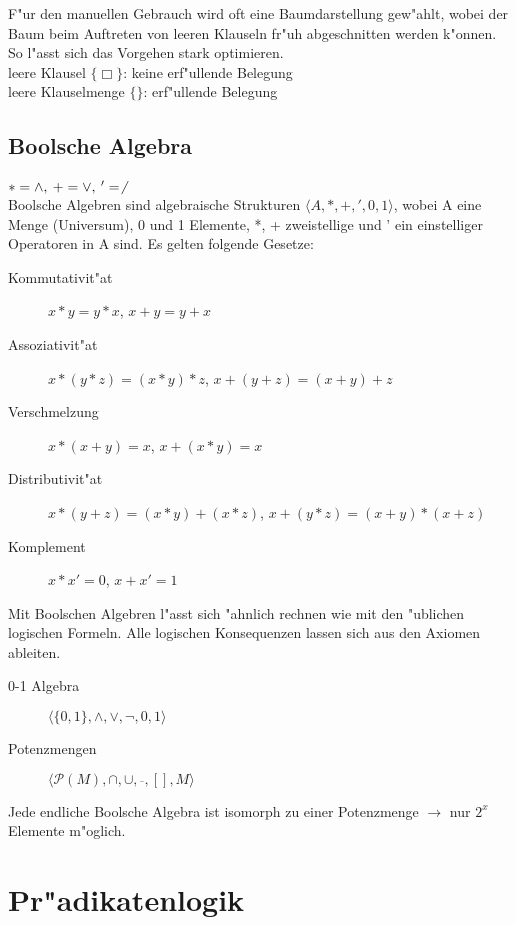 \documentclass[11pt, a4paper,twocolumn]{scrartcl}
\begin{document}
F"ur den manuellen Gebrauch wird oft eine Baumdarstellung gew"ahlt, wobei der Baum beim Auftreten von leeren Klauseln fr"uh abgeschnitten werden k"onnen. So l"asst sich das Vorgehen stark optimieren.\\
leere Klausel $\{\Box\}$: keine erf"ullende Belegung\\
leere Klauselmenge $\{\}$: erf"ullende Belegung

\subsection{Boolsche Algebra}
\paragraph{}
$*=\land,\:+=\lor, \:'=\not$\\
Boolsche Algebren sind algebraische Strukturen $\langle A,*,+,',0,1\rangle$, wobei A eine Menge (Universum), 0 und 1 Elemente, *, + zweistellige und ' ein einstelliger Operatoren in A sind. Es gelten folgende Gesetze:
\begin{description}
 \item[Kommutativit"at] $x*y=y*x$, $x+y=y+x$
 \item[Assoziativit"at] $x*(y*z)=(x*y)*z$, $x+(y+z)=(x+y)+z$
 \item[Verschmelzung] $x*(x+y)=x$, $x+(x*y)=x$
 \item[Distributivit"at] $x*(y+z)=(x*y)+(x*z)$, $x+(y*z)=(x+y)*(x+z)$
 \item[Komplement] $x*x'=0$, $x+x'=1$
\end{description}

Mit Boolschen Algebren l"asst sich "ahnlich rechnen wie mit den "ublichen logischen Formeln. Alle logischen Konsequenzen lassen sich aus den Axiomen ableiten.
\begin{description}
 \item[0-1 Algebra] $\langle \{0,1\},\land,\lor,\lnot,0,1\rangle$
 \item[Potenzmengen] $\langle \mathcal{P}(M),\cap,\cup,\overline{\;},[],M\rangle$
\end{description}

Jede endliche Boolsche Algebra ist isomorph zu einer Potenzmenge $\rightarrow$ nur $2^x$ Elemente m"oglich.


\section{Pr"adikatenlogik}
\end{document}
